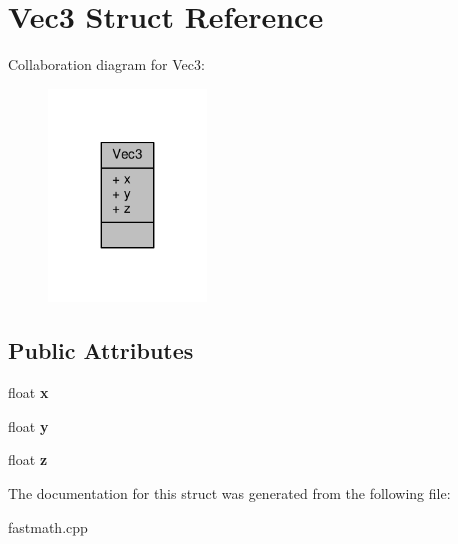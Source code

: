 \hypertarget{structVec3}{}\section{Vec3 Struct Reference}
\label{structVec3}


Collaboration diagram for Vec3\+:
\nopagebreak
\begin{figure}[H]
\begin{center}
\leavevmode
\includegraphics[width=119pt]{d2/d85/structVec3__coll__graph}
\end{center}
\end{figure}
\subsection*{Public Attributes}
\begin{DoxyCompactItemize}
\item 
float {\bfseries x}\hypertarget{structVec3_a2814580e9b9372738c0a61197ea46b51}{}\label{structVec3_a2814580e9b9372738c0a61197ea46b51}

\item 
float {\bfseries y}\hypertarget{structVec3_abc1d241232cb04aa98217a942402ae68}{}\label{structVec3_abc1d241232cb04aa98217a942402ae68}

\item 
float {\bfseries z}\hypertarget{structVec3_a64f3f00cd2dd9076999eeb2f05210388}{}\label{structVec3_a64f3f00cd2dd9076999eeb2f05210388}

\end{DoxyCompactItemize}


The documentation for this struct was generated from the following file\+:\begin{DoxyCompactItemize}
\item 
fastmath.\+cpp\end{DoxyCompactItemize}
